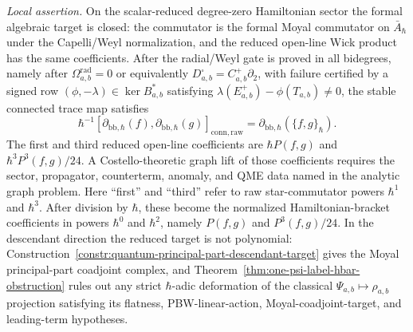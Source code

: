 \begin{stmt}
  \emph{Local assertion.} On the scalar-reduced degree-zero Hamiltonian
  sector the formal algebraic target is closed: the commutator is the
  formal Moyal commutator on \(\bar A_\hbar\) under the Capelli/Weyl
  normalization, and the reduced open-line Wick product has the same
  coefficients.  After the radial/Weyl gate is proved in all bidegrees,
  namely after
  \(\Omega^{\mathrm{rad}}_{a,b}=0\) or equivalently
  \(D^\square_{a,b}=C^+_{a,b}\partial_2\), with failure certified by a
  signed row
  \((\phi,-\lambda)\in\ker B_{a,b}^*\) satisfying
  \(\lambda(E^+_{a,b})-\phi(T_{a,b})\ne0\), the stable connected trace map
  satisfies
  \[
    \hbar^{-1}[\partial_{\mathrm{bb},\hbar}(f),
      \partial_{\mathrm{bb},\hbar}(g)]_{\mathrm{conn,raw}}
    =
    \partial_{\mathrm{bb},\hbar}(\{f,g\}_\hbar).
  \]
  The first and third reduced open-line coefficients are
  \(\hbar P(f,g)\) and \(\hbar^3P^3(f,g)/24\).  A Costello-theoretic
  graph lift of those coefficients requires the sector, propagator,
  counterterm, anomaly, and QME data named in the analytic graph problem.
  Here ``first'' and ``third'' refer to raw star-commutator powers
  \(\hbar^1\) and \(\hbar^3\).  After division by \(\hbar\), these become
  the normalized Hamiltonian-bracket coefficients in powers \(\hbar^0\)
  and \(\hbar^2\), namely \(P(f,g)\) and \(P^3(f,g)/24\).
  In the descendant direction the reduced target is not polynomial:
  Construction~\ref{constr:quantum-principal-part-descendant-target}
  gives the Moyal principal-part coadjoint complex, and
  Theorem~\ref{thm:one-psi-label-hbar-obstruction} rules out
  any strict \(\hbar\)-adic deformation of the classical
  \(\Psi_{a,b}\mapsto\rho_{a,b}\) projection satisfying its flatness,
  PBW-linear-action, Moyal-coadjoint-target, and leading-term hypotheses.


\end{stmt}
